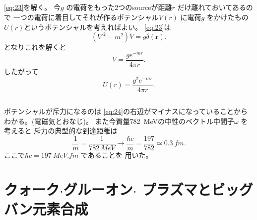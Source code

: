 \documentclass[dvipdfmx]{jsarticle}
\begin{document}
\subsection{}
\eqref{eq:23}を解く。
今$g$ の電荷をもった2つのsourceが距離$r$ だけ離れておいてあるので
一つの電荷に着目してそれが作るポテンシャル$V(r)$ に電荷$g$ 
をかけたもの$U(r)$というポテンシャルを考えればよい。
\eqref{eq:23}は
\begin{equation}
\label{eq:24}
(\nabla ^2-m^2)V=g\delta (\bm{r})
.\end{equation}
となりこれを解くと
\[
V=\frac{g e^{-mr}}{4\pi r}
.\] 
したがって
\[
U(r)=\frac{g^2e^{-mr}}{4\pi r}
.\] 
\subsection{}
ポテンシャルが斥力になるのは
\eqref{eq:24}の右辺がマイナスになっていることからわかる。(電磁気とおなじ)。
また今質量\SI{782}{MeV}の中性のベクトル中間子$\omega$ を
考えると
斥力の典型的な到達距離は
\[
\frac{1}{m}=\frac{1}{\SI{782}{MeV}}\to \frac{\hbar c}{m}=\frac{197}{782}\simeq \SI{0.3}{fm}
.\] 
ここで$\hbar c=\SI{197}{MeV .fm}$ であることを
用いた。
\section{クォーク$\cdot $グルーオン$\cdot $ プラズマとビッグバン元素合成}
\end{document}
